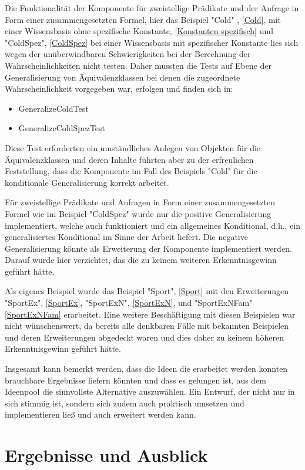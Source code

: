 \documentclass[a4paper, 11pt]{book}
\begin{document}
{	Die Funktionalität der Komponente für zweistellige Prädikate und der Anfrage in Form einer zusammengesetzten Formel, hier das Beispiel "{}Cold"{} , \ref{Cold}, mit einer Wissensbasis ohne spezifische Konstante, \ref{Konstanten spezifisch} und "{}ColdSpez"{},  \ref{ColdSpez} bei einer Wissensbasis mit spezifischer Konstante lies sich wegen der unüberwindbaren Schwierigkeiten bei der Berechnung der Wahrscheinlichkeiten nicht testen. Daher mussten die Tests auf Ebene der Generalisierung von Äquivalenzklassen bei denen die zugeordnete Wahrscheinlichkeit vorgegeben war, erfolgen und finden sich in:
	\begin{itemize}
		\item GeneralizeColdTest
		\item GeneralizeColdSpezTest
	\end{itemize}
Diese Test erforderten ein umständliches Anlegen von Objekten für die Äquivalenzklassen und deren Inhalte führten aber zu der erfreulichen Feststellung, dass die Komponente im Fall des Beispiels "{}Cold"{} für die konditionale Generalisierung korrekt arbeitet. 

Für zweistellige Prädikate und Anfragen in Form einer zusammengesetzten Formel wie im Beispiel "{}ColdSpez"{} wurde nur die positive Generalisierung implementiert, welche auch funktioniert und ein allgemeines Konditional, d.h., ein generalisiertes Konditional im Sinne der Arbeit liefert. Die negative Generalisierung könnte als Erweiterung der Komponente implementiert werden. Darauf wurde hier verzichtet, das die zu keinem weiteren Erkenntnisgewinn geführt hätte.

Als eigenes Beispiel wurde das Beispiel "{}Sport"{}, \ref{Sport} mit den Erweiterungen\\ "{}SportEx"{}, \ref{SportEx},  "{}SportExN"{}, \ref{SportExN}, und "{}SportExNFam"{} \ref{SportExNFam} erarbeitet. Eine weitere Beschäftigung mit diesen Beispielen war nicht wünschenswert, da bereits alle denkbaren Fälle mit bekannten Beispielen und deren Erweiterungen abgedeckt waren und dies daher zu keinem höheren Erkenntnisgewinn geführt hätte. 

Insgesamt kann bemerkt werden, dass die Ideen die erarbeitet werden konnten brauchbare Ergebnisse liefern könnten und dass es gelungen ist, aus dem Ideenpool die sinnvollste Alternative auszuwählen. Ein Entwurf, der nicht nur in sich stimmig ist, sondern sich zudem auch praktisch umsetzen und implementieren ließ und auch erweitert werden kann. 


\chapter{Ergebnisse und Ausblick}\label{Erg}

}
\end{document}
